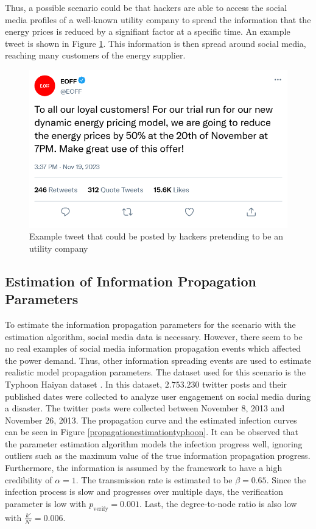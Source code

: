 Thus, a possible scenario could be that hackers are able to 
access the social media profiles of a well-known utility company
to spread the information that the energy prices is reduced by 
a signifiant factor at a specific time. An example tweet is shown in 
Figure \ref{demandtweet}. This information is then  
spread around social media, reaching many customers of the energy supplier.

\begin{figure}[!ht]
    \center
    \includegraphics[scale=.4]{figs/eondemandresponse.png}
    \caption{Example tweet that could be posted by hackers pretending to be an utility company}
    \label{demandtweet}
\end{figure}

\subsection{Estimation of Information Propagation Parameters}

To estimate the information propagation parameters for the scenario 
with the estimation 
algorithm, social media data is necessary. However, there seem to be 
no real examples of social media information propagation events 
which affected the power demand.
Thus, other information spreading events are used to estimate 
realistic model propagation parameters. The dataset used for this scenario
is the Typhoon Haiyan dataset \cite{david2016tweeting}. In this
dataset, $2.753.230$ twitter posts and their published dates were collected
to analyze user engagement on social media during a disaster. 
The twitter posts were collected
between November 8, 2013 and November 26, 2013. 
The propagation curve and the estimated infection curves can be seen in 
Figure \ref{propagationestimationtyphoon}. It can be observed 
that the parameter estimation algorithm models the infection progress
well, ignoring outliers such as the maximum value of the true information
propagation progress. Furthermore, the
information is assumed by the framework to have a high credibility 
of $\alpha=1$. The transmission rate is estimated to be
$\beta=0.65$.
Since the infection process is slow and progresses over 
multiple days, the verification parameter is
low with $p_{\mathrm{verify}}=0.001$. Last, the degree-to-node ratio
is also low with $\frac{k'}{N'}=0.006$.



